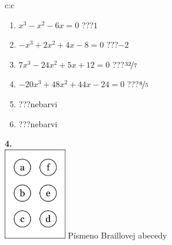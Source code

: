 \documentclass[10pt]{report}
\begin{document}
\begin{tabular}{c:c}
\begin{minipage}[c][104.5mm][t]{0.5\linewidth}
\begin{center}
\begin{minipage}{0.79\linewidth}
\begin{center}
\begin{varwidth}{\linewidth}
\begin{enumerate}
\Large
\item $x^3-x^2-6x=0$\quad \dotfill\; ???\;\dotfill \quad $1$
\item $-x^3+2x^2+4x-8=0$\quad \dotfill\; ???\;\dotfill \quad $-2$
\item $7x^3-24x^2+5x+12=0$\quad \dotfill\; ???\;\dotfill \quad $\nicefrac{32}{7}$
\item $-20x^3+48x^2+44x-24=0$\quad \dotfill\; ???\;\dotfill \quad $\nicefrac{8}{5}$
\item \quad \dotfill\; ???\;\dotfill \quad nebarvi
\item \quad \dotfill\; ???\;\dotfill \quad nebarvi
\end{enumerate}
\end{varwidth}
\end{center}
\end{minipage}
\begin{minipage}{0.20\linewidth}
\begin{center}
{\Huge\bfseries 4.} \\[2mm]
\includegraphics[height=40mm]{../images/braille.png}
{\small Písmeno Braillovej abecedy}
\end{center}
\end{minipage}
\end{center}
\end{minipage}
%
\end{tabular}
\newpage
\thispagestyle{empty}
\end{document}
